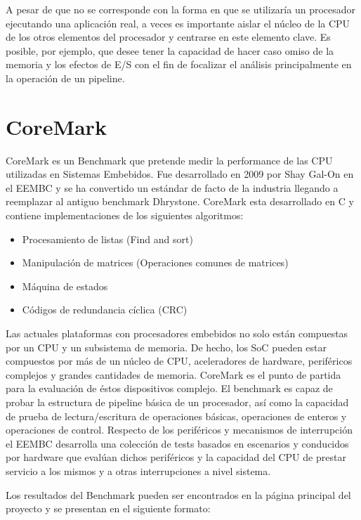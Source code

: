 	A pesar de que no se corresponde con la forma en que se utilizaría un procesador ejecutando una aplicación real, a veces es importante aislar el
 	núcleo de la CPU de los otros elementos del procesador y centrarse en este elemento clave. Es posible, por ejemplo,  que desee tener la capacidad de
 	hacer caso omiso de la memoria y los efectos de E/S con el fin de focalizar el análisis principalmente en la operación de un pipeline. 

	\section{CoreMark}	
	CoreMark es un Benchmark que pretende medir la performance de las CPU utilizadas en Sistemas Embebidos. Fue desarrollado en 2009 por Shay Gal-On en
	el EEMBC y se ha convertido un estándar de facto de la industria llegando a reemplazar al antiguo benchmark Dhrystone. CoreMark esta desarrollado en
	C y contiene implementaciones de los siguientes algoritmos:
	
	\begin{itemize}
	\item Procesamiento de listas (Find and sort)
	\item Manipulación de matrices (Operaciones comunes de matrices)
	\item Máquina de estados 
	\item Códigos de redundancia cíclica (CRC)  
	\end{itemize}	 
	
	Las actuales plataformas con procesadores embebidos no solo están compuestas por un CPU y un subsistema de memoria. De hecho, los SoC pueden estar
	compuestos por más de un núcleo de CPU, aceleradores de hardware, periféricos complejos y grandes cantidades de memoria. CoreMark es el punto de
	partida para la evaluación de éstos dispositivos complejo. El benchmark es capaz de probar la estructura de pipeline básica de un procesador, así
	como la capacidad de prueba de lectura/escritura de operaciones básicas, operaciones de enteros y operaciones de control. Respecto de los periféricos
	y mecanismos de interrupción el EEMBC desarrolla una colección de tests basados en escenarios y conducidos por hardware que evalúan dichos
	periféricos y la capacidad del CPU de prestar servicio a los mismos y a otras interrupciones a nivel sistema.
	
	Los resultados del Benchmark pueden ser encontrados en la página principal del proyecto y se presentan en el siguiente formato:
	
